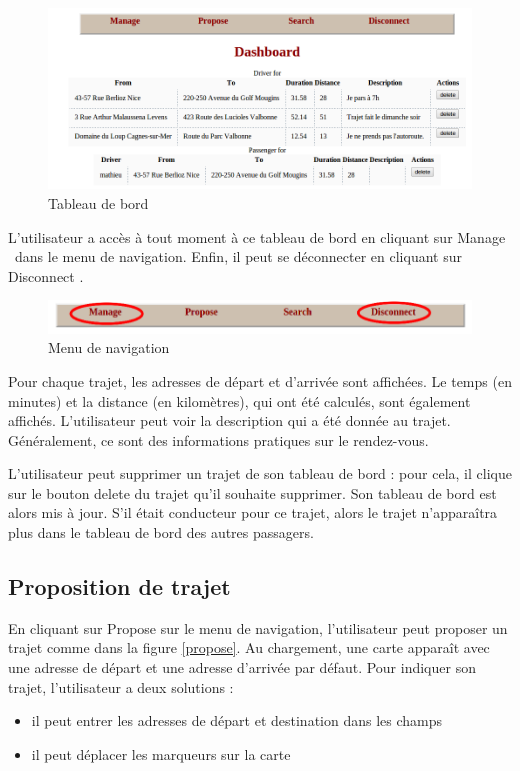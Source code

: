 \documentclass[a4paper]{article}
\begin{document}
\begin{figure}[!ht]
	\centering
	\includegraphics[scale=0.5]{Dashboard.png}
	\caption{\label{dashboard} Tableau de bord}
\end{figure}

L'utilisateur a accès à tout moment à ce tableau de bord en cliquant
sur \og Manage \fg\ dans le menu de navigation. Enfin, il peut se
déconnecter en cliquant sur \og Disconnect \fg.

\begin{figure}[!ht]
	\centering
	\includegraphics[scale=0.4]{Menu.png}
	\caption{\label{menu} Menu de navigation}
\end{figure}

\newpage

Pour chaque trajet, les adresses de départ et d'arrivée sont affichées.
Le temps (en minutes) et la distance (en kilomètres), qui ont été calculés,
sont également affichés. L'utilisateur peut voir la description qui a été
donnée au trajet. Généralement, ce sont des informations pratiques sur
le rendez-vous.

L'utilisateur peut supprimer un trajet de son tableau de bord : pour cela,
il clique sur le bouton \og delete \fg du trajet qu'il souhaite supprimer.
Son tableau de bord est alors mis à jour. S'il était conducteur pour ce
trajet, alors le trajet n'apparaîtra plus dans le tableau de bord des
autres passagers. 

\subsection{Proposition de trajet}

En cliquant sur \og Propose \fg sur le menu de navigation, l'utilisateur peut
proposer un trajet comme dans la figure \ref{propose}. Au chargement,
une carte apparaît avec une adresse de départ et une adresse d'arrivée
par défaut. Pour indiquer son trajet, l'utilisateur a deux solutions 
:
\begin{itemize}
	\item il peut entrer les adresses de départ et destination dans les champs
	\item il peut déplacer les marqueurs sur la carte
\end{itemize}
\end{document}
